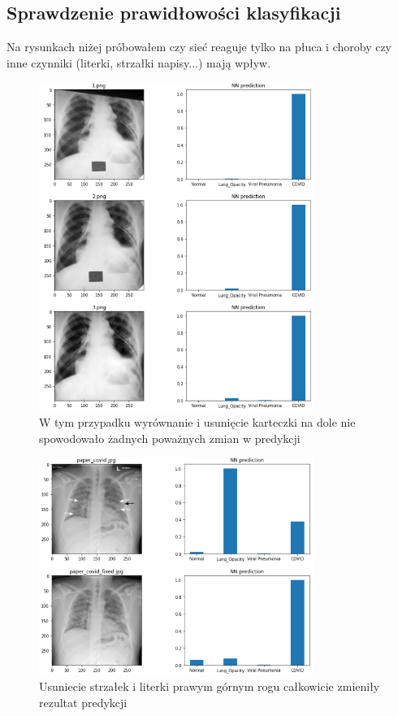 \documentclass{article}
\begin{document}
\subsection{Sprawdzenie prawidłowości klasyfikacji}

Na rysunkach niżej próbowałem czy sieć reaguje tylko na płuca i choroby czy inne czynniki (literki, strzałki napisy...) mają wpływ.


\begin{figure}[H]
	\centering
	\includegraphics[width=0.8\textwidth,keepaspectratio=true]{fixing_image_exp}
	\caption{W tym przypadku wyrównanie i usunięcie karteczki na dole nie spowodowało żadnych poważnych zmian w predykcji }
	\label{}
\end{figure}

\begin{figure}[H]
	\centering
	\includegraphics[width=0.8\textwidth,keepaspectratio=true]{paper_covid_exp}
	\caption{Usuniecie strzałek i literki prawym górnym rogu całkowicie zmieniły rezultat predykcji}
	\label{}
\end{figure}
\end{document}
